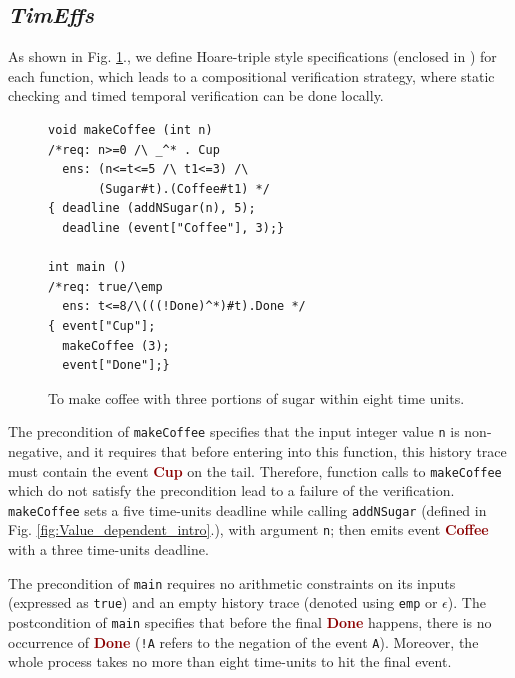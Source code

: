 \documentclass[acmsmall,10pt,review]{acmart}
\newcommand{\codem}[1]{{\lstinline[basicstyle=\small\ttfamily]|#1|}}
\newcommand{\timedEffects}{\emph{TimEffs}}
\newcommand{\anyevent}[1]{{\textcolor{darkred}
{{\textbf{\footnotesize #1}}}}}
\newcommand{\code}[1]{{\tt{\ensuremath{\m{#1}}}}}
\newcommand{\m}{\mathit}
\newcommand\figref[1]{Fig. \textcolor{black}{\ref{#1}}.}
\begin{document}
\subsection{\timedEffects}
As shown in \figref{fig:overview_coffee}, we define Hoare-triple 
style specifications (enclosed in 
\textcolor{darklavender}{}) for each function, 
which leads to a compositional verification strategy, where static 
checking and timed temporal verification can be done locally. 



\begin{figure}
\begin{lstlisting}[name=coffee]
void makeCoffee (int n)
/*req: n>=0 /\ _^* . Cup
  ens: (n<=t<=5 /\ t1<=3) /\
       (Sugar#t).(Coffee#t1) */
{ deadline (addNSugar(n), 5);
  deadline (event["Coffee"], 3);}  

int main ()
/*req: true/\emp
  ens: t<=8/\(((!Done)^*)#t).Done */ 
{ event["Cup"];
  makeCoffee (3);
  event["Done"];}
\end{lstlisting}  
\caption{To make coffee with three portions of sugar 
within eight time units.}\label{fig:overview_coffee}
\end{figure}



The precondition of \codem{makeCoffee} 
 specifies that the input integer value \codem{n} is non-negative, and it requires that before entering into this 
function, this history trace must contain the event  
\anyevent{Cup} on the tail. Therefore, function calls to \codem{makeCoffee} which 
do not satisfy the precondition lead to a failure of the verification. 
\codem{makeCoffee} sets a 
five time-units deadline while calling 
\codem{addNSugar} (defined in \figref{fig:Value_dependent_intro}),
 with argument \codem{n}; then emits event \anyevent{Coffee} with
 a three time-units deadline. 


The precondition of \codem{main} requires no arithmetic constraints 
on its inputs (expressed as \codem{true}) and 
an empty history trace (denoted using \codem{emp} or \code{\epsilon}).
The postcondition of \codem{main} specifies 
that before the final \anyevent{Done} happens, there is no 
occurrence of \anyevent{Done} (\codem{!A} refers to the 
negation of the event \codem{A}). Moreover, the whole process takes 
no more than eight time-units to hit the final event. 
\end{document}
